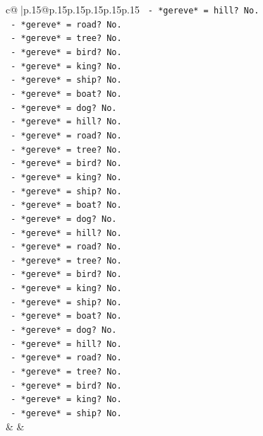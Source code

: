 \documentclass{article}
\begin{document}
{\begin{supertabular}{c@{$\;$}|p{.15\linewidth}@{}p{.15\linewidth}p{.15\linewidth}p{.15\linewidth}p{.15\linewidth}p{.15\linewidth}}
{{{\texttt{            {-} *gereve* = hill? No.} \\
\texttt{            {-} *gereve* = road? No.} \\
\texttt{            {-} *gereve* = tree? No.} \\
\texttt{            {-} *gereve* = bird? No.} \\
\texttt{            {-} *gereve* = king? No.} \\
\texttt{            {-} *gereve* = ship? No.} \\
\texttt{            {-} *gereve* = boat? No.} \\
\texttt{            {-} *gereve* = dog? No.} \\
\texttt{            {-} *gereve* = hill? No.} \\
\texttt{            {-} *gereve* = road? No.} \\
\texttt{            {-} *gereve* = tree? No.} \\
\texttt{            {-} *gereve* = bird? No.} \\
\texttt{            {-} *gereve* = king? No.} \\
\texttt{            {-} *gereve* = ship? No.} \\
\texttt{            {-} *gereve* = boat? No.} \\
\texttt{            {-} *gereve* = dog? No.} \\
\texttt{            {-} *gereve* = hill? No.} \\
\texttt{            {-} *gereve* = road? No.} \\
\texttt{            {-} *gereve* = tree? No.} \\
\texttt{            {-} *gereve* = bird? No.} \\
\texttt{            {-} *gereve* = king? No.} \\
\texttt{            {-} *gereve* = ship? No.} \\
\texttt{            {-} *gereve* = boat? No.} \\
\texttt{            {-} *gereve* = dog? No.} \\
\texttt{            {-} *gereve* = hill? No.} \\
\texttt{            {-} *gereve* = road? No.} \\
\texttt{            {-} *gereve* = tree? No.} \\
\texttt{            {-} *gereve* = bird? No.} \\
\texttt{            {-} *gereve* = king? No.} \\
\texttt{            {-} *gereve* = ship? No.} \\
            }
        }
    }
    & & \\ \\


\end{supertabular}}
\end{document}
